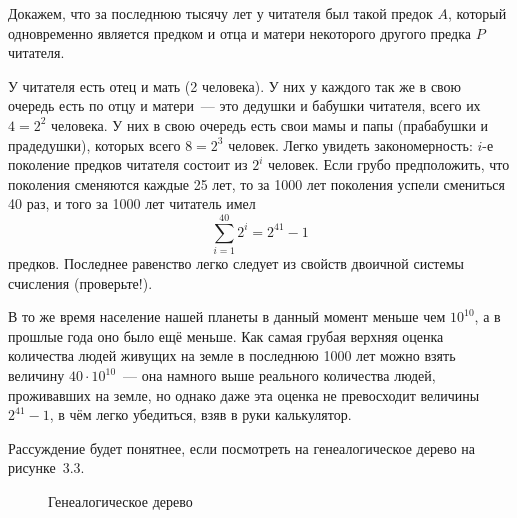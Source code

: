 \begin{example}
Докажем, что за последнюю тысячу лет у читателя был такой предок $A$, который одновременно является предком и отца и матери некоторого другого предка $P$ читателя.

У читателя есть отец и мать (2 человека). У них у каждого так же в свою очередь есть по отцу и матери~— это дедушки и бабушки читателя, всего их $4=2^2$ человека. У них в свою очередь есть свои мамы и папы (прабабушки и прадедушки), которых всего $8=2^3$ человек. Легко увидеть закономерность: $i$-е поколение предков читателя состоит из $2^i$ человек. Если грубо предположить, что поколения сменяются каждые 25 лет, то за 1000 лет поколения успели смениться 40 раз, и того за 1000 лет читатель имел
$$\sum_{i=1}^{40} 2^i = 2^{41} - 1$$
предков. Последнее равенство легко следует из свойств двоичной системы счисления (проверьте!).

В то же время население нашей планеты в данный момент меньше чем $10^{10}$, а в прошлые года оно было ещё меньше. Как самая грубая верхняя оценка количества людей живущих на земле в последнюю 1000 лет можно взять величину $40\cdot 10^10$~— она намного выше реального количества людей, проживавших на земле, но однако даже эта оценка не превосходит величины $2^{41} - 1$, в чём легко убедиться, взяв в руки калькулятор.

Рассуждение будет понятнее, если посмотреть на генеалогическое дерево на рисунке~3.3.

\begin{figure}[h]
\centering
{}
\caption{Генеалогическое дерево}
\end{figure}


\end{example}
